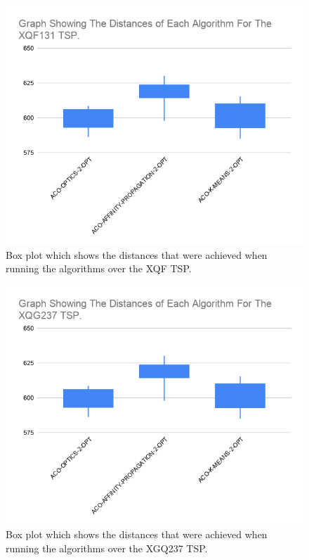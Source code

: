 \begin{figure}
    \centering
    \includegraphics[width=\textwidth]{figures/tsp_distance_xqf131_graph.png}
    \caption{Box plot which shows the distances that were achieved when running the algorithms over the XQF TSP.}
    \label{fig:tsp_distance_xqf131_graph}
\end{figure}

\begin{figure}
    \centering
    \includegraphics[width=\textwidth]{figures/tsp_distance_xqg237_graph.png}
    \caption{Box plot which shows the distances that were achieved when running the algorithms over the XGQ237 TSP.}
    \label{fig:tsp_distance_xqg237_graph}
\end{figure}

